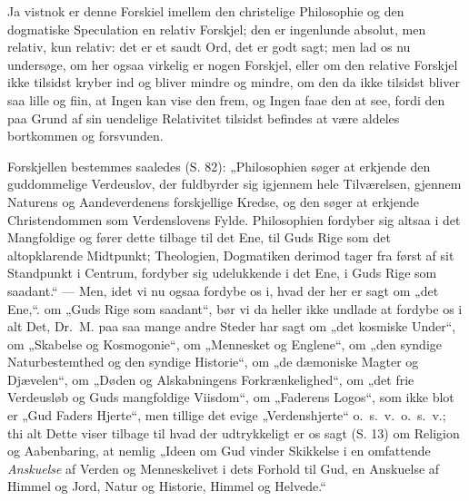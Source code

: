 Ja vistnok er denne Forskiel imellem den christelige Philosophie
og den dogmatiske Speculation en relativ Forskjel; den er
ingenlunde absolut, men relativ, kun relativ: det er et saudt Ord,
det er godt sagt; men lad os nu undersøge, om her ogsaa virkelig
er nogen Forskjel, eller om den relative Forskjel ikke tilsidst
kryber ind og bliver mindre og mindre, om den da ikke tilsidst
bliver saa lille og fiin, at Ingen kan vise den frem, og Ingen
faae den at see, fordi den paa Grund af sin uendelige Relativitet
tilsidst befindes at være aldeles bortkommen og forsvunden.

Forskjellen bestemmes saaledes (S. 82): „Philosophien søger at
erkjende den guddommelige Verdeuslov, der
 fuldbyrder sig igjennem hele Tilværelsen, gjennem Naturens og
Aandeverdenens forskjellige Kredse, og den søger at erkjende
Christendommen som Verdenslovens Fylde. Philosophien fordyber sig
altsaa i det Mangfoldige og fører dette tilbage til det Ene, til
Guds Rige som det altopklarende Midtpunkt; Theologien, Dogmatiken
derimod tager fra først af sit Standpunkt i Centrum, fordyber sig
udelukkende i det Ene, i Guds Rige som saadant.“ --- Men, idet vi
nu ogsaa fordybe os i, hvad der her er sagt om „det Ene,“. om „Guds
Rige som saadant“, bør vi da heller ikke undlade at fordybe os i
alt Det, Dr.\ M. paa saa mange andre Steder har sagt om „det
kosmiske Under“, om „Skabelse og Kosmogonie“, om „Mennesket og
Englene“, om „den syndige Naturbestemthed og den syndige
Historie“, om „de dæmoniske Magter og Djævelen“, om „Døden og
Alskabningens Forkrænkelighed“, om „det frie Verdeusløb og Guds
mangfoldige Viisdom“, om „Faderens Logos“, som ikke blot er „Gud
Faders Hjerte“, men tillige det evige „Verdenshjerte“ o.\ s.\ v.\
o.\ s.\ v.; thi alt Dette viser tilbage til hvad der udtrykkeligt
er os sagt (S. 13) om Religion og Aabenbaring, at nemlig „Ideen om
Gud vinder Skikkelse i en omfattende \emph{Anskuelse} af Verden og
Menneskelivet i dets Forhold til Gud, en Anskuelse af Himmel og
Jord, Natur og Historie, Himmel og Helvede.“


